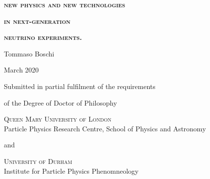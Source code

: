 
\begin{center}

	\vspace*{10em}

	\textsc{\Huge \bfseries new physics and new technologies}

	\medskip
	\textsc{\Huge \bfseries in next-generation}

	\medskip
	\textsc{\Huge \bfseries neutrino experiments.}

	\vspace{5em}
	{\Large Tommaso Boschi}

	 March 2020

	\vfill
	Submitted in partial fulfilment of the requirements

	of the Degree of Doctor of Philosophy

	\vfill
	{\large
	\textsc{Queen Mary University of London} \\
	Particle Physics Research Centre, School of Physics and Astronomy}

	\bigskip
	and

	\bigskip
	{\large
	\textsc{University of Durham} \\ 
	Institute for Particle Physics Phenomneology}
	\vspace*{5em}

\end{center}

\restoregeometry
